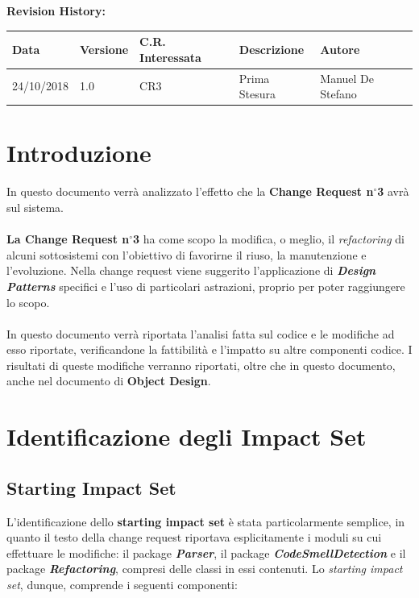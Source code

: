 	\textbf{Revision History:}
	\begin{table}[h]
		\centering
		\begin{tabularx}{0.9\textwidth}{|p{2cm}|l|p{2cm}|X|p{2cm}|}
			\hline
			\textbf{Data} & \textbf{Versione}& \textbf{C.R. Interessata} & \textbf{Descrizione} & \textbf{Autore} \\ \hline
			24/10/2018 & 1.0 & CR3 & Prima Stesura & Manuel De Stefano \\ \hline
		\end{tabularx}
	\end{table}

	\vfill
	\newpage
	
	\tableofcontents
	\newpage
	
	\section{Introduzione}
		In questo documento verrà analizzato l'effetto che la \textbf{Change Request n$^\circ$3} avrà sul sistema. 
		
		\paragraph{} \textbf{La Change Request n$^\circ$3} ha come scopo la modifica, o meglio, il \textit{refactoring} di alcuni sottosistemi con l'obiettivo di favorirne il riuso, la manutenzione e l'evoluzione. Nella change request viene suggerito l'applicazione di \textbf{\textit{Design Patterns}} specifici e l'uso di particolari astrazioni, proprio per poter raggiungere lo scopo.
		
		\paragraph{} In questo documento verrà riportata l'analisi fatta sul codice e le modifiche ad esso riportate, verificandone la fattibilità e l'impatto su altre componenti codice. I risultati di queste modifiche verranno riportati, oltre che in questo documento, anche nel documento di \textbf{Object Design}.
	

	\section{Identificazione degli Impact Set}
	
	\subsection{Starting Impact Set}
	L'identificazione dello \textbf{starting impact set} è stata particolarmente semplice, in quanto il testo della change request riportava esplicitamente i moduli su cui effettuare le modifiche: il package \textit{\textbf{Parser}}, il package \textbf{\textit{CodeSmellDetection}} e il package \textit{\textbf{Refactoring}}, compresi delle classi in essi contenuti. Lo \textit{starting impact set}, dunque, comprende i seguenti componenti: 
	
